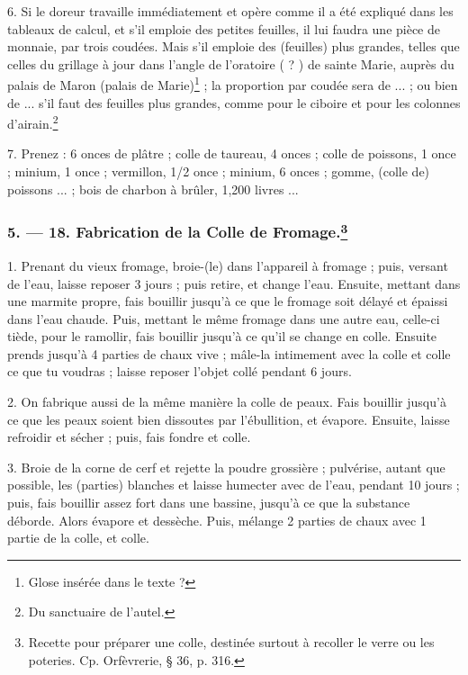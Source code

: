 \documentclass[a4paper, 11pt, oneside, polutonikogreek, french]{article}
\begin{document}
6. Si le doreur travaille immédiatement et opère comme il a été expliqué dans les tableaux de calcul, et s'il emploie des petites feuilles, il lui faudra une pièce de monnaie, par trois coudées. Mais s'il emploie des (feuilles) plus grandes, telles que celles du grillage à jour dans l'angle de l'oratoire ( ? ) de sainte Marie, auprès du palais de Maron (palais de Marie)\footnote{Glose insérée dans le texte ?} ; la proportion par coudée sera de ... ; ou bien de ... s'il faut des feuilles plus grandes, comme pour le ciboire et pour les colonnes d'airain.\footnote{Du sanctuaire de l'autel.}

7. Prenez : 6 onces de plâtre ; colle de taureau, 4 onces ; colle de poissons, 1 once ; minium, 1 once ; vermillon, 1/2 once ; minium, 6 onces ; gomme, (colle de) poissons ... ; bois de charbon à brûler, 1,200 livres ...

\bigskip
\centerline{\EightStarTaper}
\centerline{\EightStarTaper\EightStarTaper}
\bigskip

\subsubsection[5. --- 18. Fabrication de la Colle de Fromage.]{5. --- 18. Fabrication de la Colle de Fromage.\footnote{Recette pour préparer une colle, destinée surtout à recoller le verre ou les poteries. Cp. Orfèvrerie, § 36, p. 316.}}

1. Prenant du vieux fromage, broie-(le) dans l'appareil à fromage ; puis, versant de l'eau, laisse reposer 3 jours ; puis retire, et change l'eau. Ensuite, mettant dans une marmite propre, fais bouillir jusqu'à ce que le fromage soit délayé et épaissi dans l'eau chaude. Puis, mettant le même fromage dans une autre eau, celle-ci tiède, pour le ramollir, fais bouillir jusqu'à ce qu'il se change en colle. Ensuite prends jusqu'à 4 parties de chaux vive ; mâle-la intimement avec la colle et colle ce que tu voudras ; laisse reposer l'objet collé pendant 6 jours.

2. On fabrique aussi de la même manière la colle de peaux. Fais bouillir jusqu'à ce que les peaux soient bien dissoutes par l'ébullition, et évapore. Ensuite, laisse refroidir et sécher ; puis, fais fondre et colle.

3. Broie de la corne de cerf et rejette la poudre grossière ; pulvérise, autant que possible, les (parties) blanches et laisse humecter avec de l'eau, pendant 10 jours ; puis, fais bouillir assez fort dans une bassine, jusqu'à ce que la substance déborde. Alors évapore et dessèche. Puis, mélange 2 parties de chaux avec 1 partie de la colle, et colle.
\end{document}
